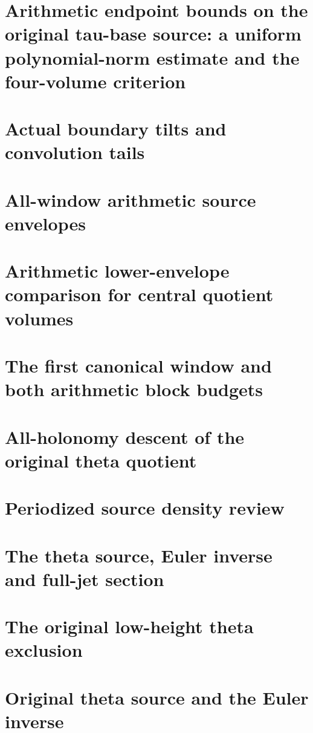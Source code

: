 \documentclass[11pt,a4paper,oneside,openany]{book}
\theoremstyle{definition}
\begin{document}
\chapter{Arithmetic endpoint bounds on the original tau-base source: a uniform polynomial-norm estimate and the four-volume criterion}
\begingroup

\endgroup
\chapter{Actual boundary tilts and convolution tails}
\begingroup

\endgroup
\chapter{All-window arithmetic source envelopes}
\begingroup

\endgroup
\chapter{Arithmetic lower-envelope comparison for central quotient volumes}
\begingroup

\endgroup
\chapter{The first canonical window and both arithmetic block budgets}
\begingroup

\endgroup
\chapter{All-holonomy descent of the original theta quotient}
\begingroup

\endgroup
\chapter{Periodized source density review}
\begingroup

\endgroup
\chapter{The theta source, Euler inverse and full-jet section}
\begingroup

\endgroup
\chapter{The original low-height theta exclusion}
\begingroup

\endgroup
\chapter{Original theta source and the Euler inverse}
\begingroup

\endgroup
\end{document}
